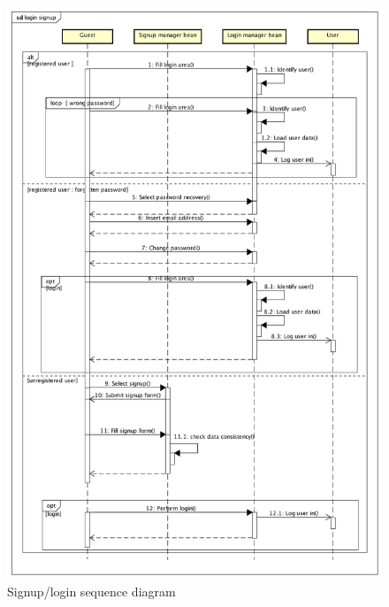 \begin{figure}
	\centering
	\includegraphics[width=1.3\linewidth, height=0.8\textheight]{images/signuplogin.png}
	\caption{Signup/login sequence diagram}
	
	\label{fig:signuplogin}
\end{figure}

